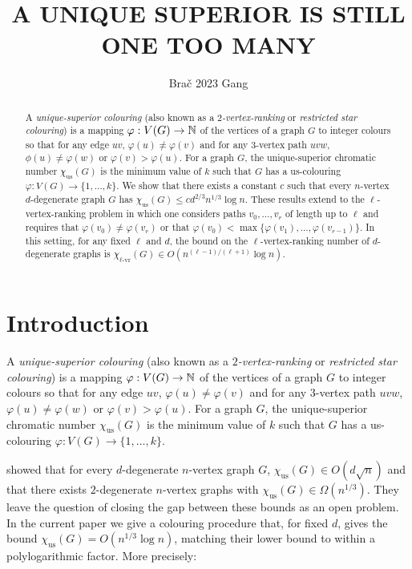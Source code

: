 \documentclass{patmorin}
\title{\MakeUppercase{A Unique Superior is Still One Too Many}}
\author{Bra\v{c} 2023 Gang}
\newcommand{\defin}[1]{\emph{\color{brightmaroon}#1}}
\newcommand{\rn}[1]{\chi_{\operatorname{#1-vr}}}
\newcommand{\trn}{\chi_{\mathrm{us}}}
\newcommand{\lrn}{\rn{\ell}}
\begin{document}
\maketitle

\begin{abstract}
  A \defin{unique-superior colouring} (also known as a \defin{$2$-vertex-ranking} or \defin{restricted star colouring}) is a mapping $\varphi:V(G)\to\mathbb{N}$ of the vertices of a graph $G$ to integer colours so that for any edge $uv$, $\varphi(u)\neq \varphi(v)$ and for any $3$-vertex path $uvw$, $\phi(u)\neq\varphi(w)$ or $\varphi(v)>\varphi(u)$.  For a graph $G$, the unique-superior chromatic number $\trn(G)$ is the minimum value of $k$ such that $G$ has a us-colouring $\varphi:V(G)\to\{1,\ldots,k\}$.  We show that there exists a constant $c$ such that every $n$-vertex $d$-degenerate graph $G$ has $\trn(G) \le cd^{2/3} n^{1/3}\log n$.  These results extend to the $\ell$-vertex-ranking problem in which one considers paths $v_0,\ldots,v_r$ of length up to $\ell$ and requires that $\varphi(v_0)\neq\varphi(v_r)$ or that $\varphi(v_0)<\max\{\varphi(v_1),\ldots,\varphi(v_{r-1})\}$.  In this setting, for any fixed $\ell$ and $d$, the bound on the $\ell$-vertex-ranking number of $d$-degenerate graphs is $\lrn(G)\in O(n^{(\ell-1)/(\ell+1)}\log n)$.
\end{abstract}


%



\section{Introduction}

A \defin{unique-superior colouring} (also known as a \defin{$2$-vertex-ranking} or \defin{restricted star colouring}) is a mapping $\varphi:V(G)\to\mathbb{N}$ of the vertices of a graph $G$ to integer colours so that for any edge $uv$, $\varphi(u)\neq \varphi(v)$ and for any $3$-vertex path $uvw$, $\varphi(u)\neq\varphi(w)$ or $\varphi(v)>\varphi(u)$.  For a graph $G$, the unique-superior chromatic number $\trn(G)$ is the minimum value of $k$ such that $G$ has a us-colouring $\varphi:V(G)\to\{1,\ldots,k\}$.

\citet{karpas.neiman.ea:on} showed that for every $d$-degenerate $n$-vertex graph $G$, $\trn(G)\in O(d\sqrt{n})$ and that there exists $2$-degenerate $n$-vertex graphs with $\trn(G)\in\Omega(n^{1/3})$.  They leave the question of closing the gap between these bounds as an open problem.  In the current paper we give a colouring procedure that, for fixed $d$, gives the bound $\trn(G)=O(n^{1/3}\log n)$, matching their lower bound to within a polylogarithmic factor.  More precisely:
\end{document}
